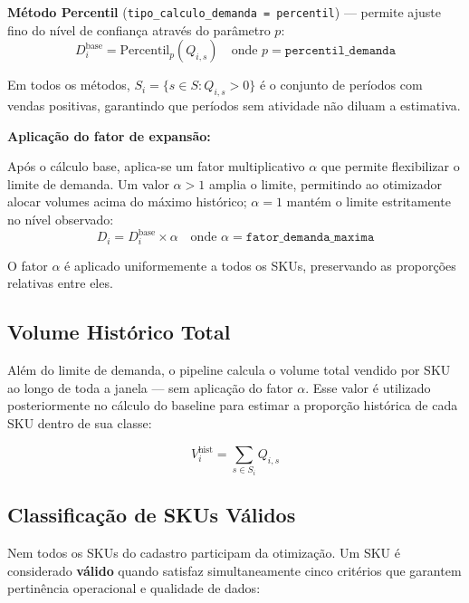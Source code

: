 \documentclass[11pt,a4paper]{article}
\begin{document}
\textbf{Método Percentil} (\texttt{tipo\_calculo\_demanda = percentil}) ---
permite ajuste fino do nível de confiança através do parâmetro $p$:
\begin{equation}\label{eq:auto:013}
D_i^{\text{base}} = \text{Percentil}_p(Q_{i,s}) \quad \text{onde } p = \texttt{percentil\_demanda}
\end{equation}

Em todos os métodos, $S_i = \{s \in S : Q_{i,s} > 0\}$ é o conjunto de
períodos com vendas positivas, garantindo que períodos sem atividade não diluam
a estimativa.

\textbf{Aplicação do fator de expansão:}

Após o cálculo base, aplica-se um fator multiplicativo $\alpha$ que permite
flexibilizar o limite de demanda. Um valor $\alpha > 1$ amplia o limite,
permitindo ao otimizador alocar volumes acima do máximo histórico; $\alpha = 1$
mantém o limite estritamente no nível observado:
\begin{equation}\label{eq:auto:014}
D_i = D_i^{\text{base}} \times \alpha \quad \text{onde } \alpha = \texttt{fator\_demanda\_maxima}
\end{equation}

O fator $\alpha$ é aplicado uniformemente a todos os SKUs, preservando as
proporções relativas entre eles.

\subsection{Volume Histórico Total}

Além do limite de demanda, o pipeline calcula o volume total vendido por SKU ao
longo de toda a janela --- sem aplicação do fator $\alpha$. Esse valor é
utilizado posteriormente no cálculo do baseline para estimar a proporção
histórica de cada SKU dentro de sua classe:

\begin{equation}\label{eq:auto:015}
V_i^{\text{hist}} = \sum_{s \in S_i} Q_{i,s}
\end{equation}

\subsection{Classificação de SKUs Válidos}

Nem todos os SKUs do cadastro participam da otimização. Um SKU é considerado
\textbf{válido} quando satisfaz simultaneamente cinco critérios que garantem
pertinência operacional e qualidade de dados:
\end{document}
